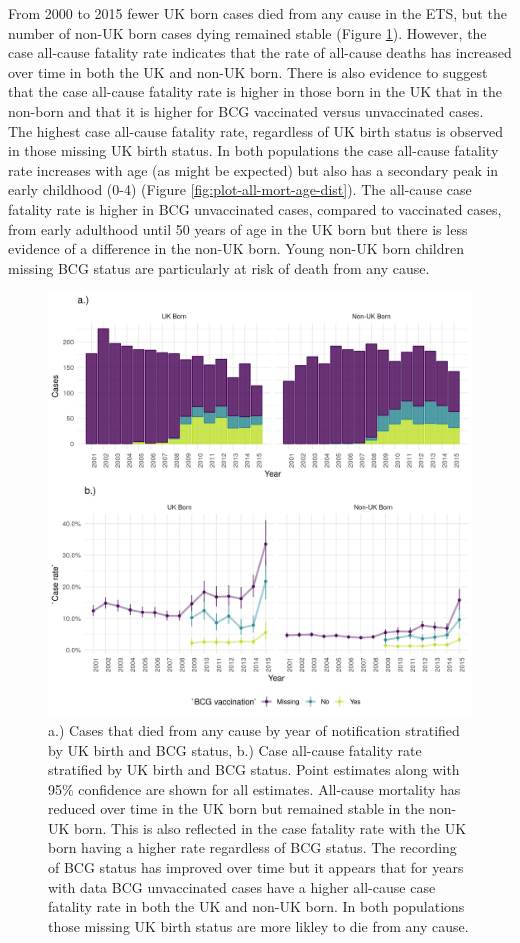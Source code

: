 \documentclass[11pt,twoside]{bristolthesis}
\begin{document}
  From 2000 to 2015 fewer UK born cases died from any cause in the ETS, but the number of non-UK born cases dying remained stable (Figure \ref{fig:plot-all-mort-case-rate}). However, the case all-cause fatality rate indicates that the rate of all-cause deaths has increased over time in both the UK and non-UK born. There is also evidence to suggest that the case all-cause fatality rate is higher in those born in the UK that in the non-born and that it is higher for BCG vaccinated versus unvaccinated cases. The highest case all-cause fatality rate, regardless of UK birth status is observed in those missing UK birth status. In both populations the case all-cause fatality rate increases with age (as might be expected) but also has a secondary peak in early childhood (0-4) (Figure \ref{fig:plot-all-mort-age-dist}). The all-cause case fatality rate is higher in BCG unvaccinated cases, compared to vaccinated cases, from early adulthood until 50 years of age in the UK born but there is less evidence of a difference in the non-UK born. Young non-UK born children missing BCG status are particularly at risk of death from any cause.
  \begin{figure}
  
  {\centering \includegraphics[width=0.8\linewidth]{chapters/tb-epi-england/figures/plot-all-mort-case-rate} 
  
  }
  
  \caption{a.) Cases that died from any cause by year of notification stratified by UK birth and BCG status, b.) Case all-cause fatality rate stratified by UK birth and BCG status. Point estimates along with 95\% confidence are shown for all estimates. All-cause mortality has reduced over time in the UK born but remained stable in the non-UK born. This is also reflected in the case fatality rate with the UK born having a higher rate regardless of BCG status. The recording of BCG status has improved over time but it appears that for years with data BCG unvaccinated cases have a higher all-cause case fatality rate in both the UK and non-UK born. In both populations those missing UK birth status are more likley to die from any cause.}\label{fig:plot-all-mort-case-rate}
  \end{figure}
\end{document}

